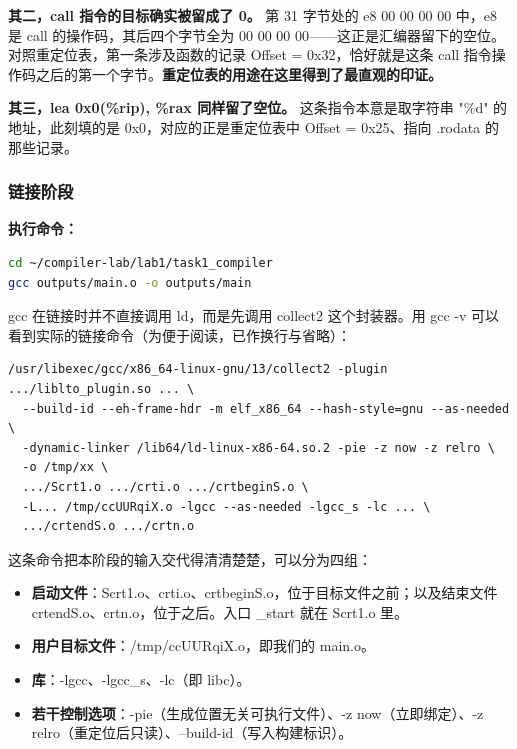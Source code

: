 \documentclass[UTF8,a4paper,10pt]{ctexart}
\begin{document}
\noindent\textbf{其二，call 指令的目标确实被留成了 0。} 第 31 字节处的 e8 00 00 00 00 中，e8 是 call 的操作码，其后四个字节全为 00 00 00 00——这正是汇编器留下的空位。对照重定位表，第一条涉及函数的记录 Offset = 0x32，恰好就是这条 call 指令操作码之后的第一个字节。\textbf{重定位表的用途在这里得到了最直观的印证。}

\noindent\textbf{其三，lea 0x0(\%rip), \%rax 同样留了空位。} 这条指令本意是取字符串 "\%d" 的地址，此刻填的是 0x0，对应的正是重定位表中 Offset = 0x25、指向 .rodata 的那些记录。

\subsubsection{链接阶段}

\textbf{执行命令：}

\begin{lstlisting}[language=bash]
cd ~/compiler-lab/lab1/task1_compiler
gcc outputs/main.o -o outputs/main
\end{lstlisting}

gcc 在链接时并不直接调用 ld，而是先调用 collect2 这个封装器。用 gcc -v 可以看到实际的链接命令（为便于阅读，已作换行与省略）：

\begin{lstlisting}
/usr/libexec/gcc/x86_64-linux-gnu/13/collect2 -plugin .../liblto_plugin.so ... \
  --build-id --eh-frame-hdr -m elf_x86_64 --hash-style=gnu --as-needed \
  -dynamic-linker /lib64/ld-linux-x86-64.so.2 -pie -z now -z relro \
  -o /tmp/xx \
  .../Scrt1.o .../crti.o .../crtbeginS.o \
  -L... /tmp/ccUURqiX.o -lgcc --as-needed -lgcc_s -lc ... \
  .../crtendS.o .../crtn.o
\end{lstlisting}

这条命令把本阶段的输入交代得清清楚楚，可以分为四组：

\begin{itemize}
  \item \textbf{启动文件}：Scrt1.o、crti.o、crtbeginS.o，位于目标文件之前；以及结束文件 crtendS.o、crtn.o，位于之后。入口 \_start 就在 Scrt1.o 里。
  \item \textbf{用户目标文件}：/tmp/ccUURqiX.o，即我们的 main.o。
  \item \textbf{库}：-lgcc、-lgcc\_s、-lc（即 libc）。
  \item \textbf{若干控制选项}：-pie（生成位置无关可执行文件）、-z now（立即绑定）、-z relro（重定位后只读）、--build-id（写入构建标识）。
\end{itemize}
\end{document}
